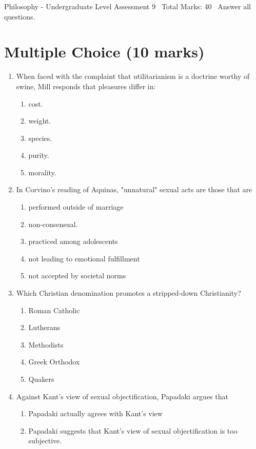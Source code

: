 \documentclass[12pt]{article}
\begin{document}
\begin{center}
Philosophy - Undergraduate Level Assessment 9 \
Total Marks: 40 \
Answer all questions.
\end{center}

\section*{Multiple Choice (10 marks)}
\begin{enumerate}[label=\arabic*.]
\item When faced with the complaint that utilitarianism is a doctrine worthy of swine, Mill responds that pleasures differ in:
\begin{enumerate}[label=(\alph*)]
    \item cost.
    \item weight.
    \item species.
    \item purity.
    \item morality.
\end{enumerate}
\item In Corvino's reading of Aquinas, "unnatural" sexual acts are those that are
\begin{enumerate}[label=(\alph*)]
    \item performed outside of marriage
    \item non-consensual.
    \item practiced among adolescents
    \item not leading to emotional fulfillment
    \item not accepted by societal norms
\end{enumerate}
\item Which Christian denomination promotes a stripped-down Christianity?
\begin{enumerate}[label=(\alph*)]
    \item Roman Catholic
    \item Lutherans
    \item Methodists
    \item Greek Orthodox
    \item Quakers
\end{enumerate}
\item Against Kant's view of sexual objectification, Papadaki argues that
\begin{enumerate}[label=(\alph*)]
    \item Papadaki actually agrees with Kant's view
    \item Papadaki suggests that Kant's view of sexual objectification is too subjective.

\end{enumerate}
\end{enumerate}
\end{document}
